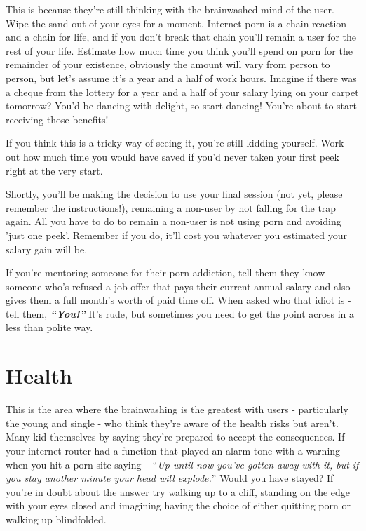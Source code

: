 \documentclass[
]{book}
\begin{document}
This is because they're still thinking with the brainwashed mind of the user. Wipe the sand out of your eyes for a moment. Internet porn is a chain reaction and a chain for life, and if you don't break that chain you'll remain a user for the rest of your life. Estimate how much time you think you'll spend on porn for the remainder of your existence, obviously the amount will vary from person to person, but let's assume it's a year and a half of work hours. Imagine if there was a cheque from the lottery for a year and a half of your salary lying on your carpet tomorrow? You'd be dancing with delight, so start dancing! You're about to start receiving those benefits!

If you think this is a tricky way of seeing it, you're still kidding yourself. Work out how much time you would have saved if you'd never taken your first peek right at the very start.

Shortly, you'll be making the decision to use your final session (not yet, please remember the instructions!), remaining a non-user by not falling for the trap again. All you have to do to remain a non-user is not using porn and avoiding 'just one peek'. Remember if you do, it'll cost you whatever you estimated your salary gain will be.

If you're mentoring someone for their porn addiction, tell them they know someone who's refused a job offer that pays their current annual salary and also gives them a full month's worth of paid time off. When asked who that idiot is - tell them, \textbf{\emph{``You!''}} It's rude, but sometimes you need to get the point across in a less than polite way.

\hypertarget{health}{%
\chapter{Health}\label{health}}

This is the area where the brainwashing is the greatest with users - particularly the young and single - who think they're aware of the health risks but aren't. Many kid themselves by saying they're prepared to accept the consequences. If your internet router had a function that played an alarm tone with a warning when you hit a porn site saying -- ``\emph{Up until now you've gotten away with it, but if you stay another minute your head will explode.}'' Would you have stayed? If you're in doubt about the answer try walking up to a cliff, standing on the edge with your eyes closed and imagining having the choice of either quitting porn or walking up blindfolded.
\end{document}
